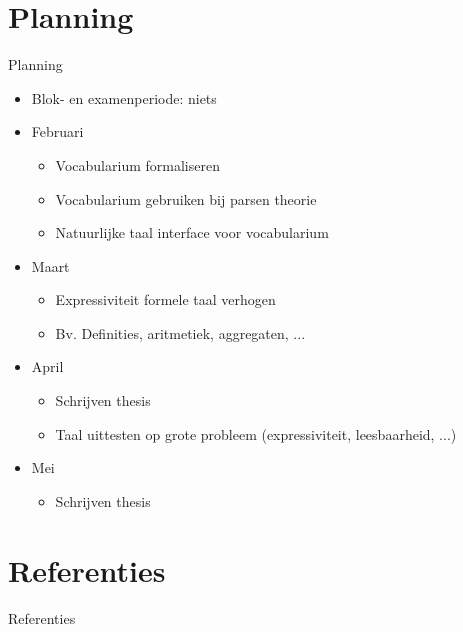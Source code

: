 \documentclass[notes, dvipsnames]{beamer}
\newcommand{\hitem}{
	\ppause
	\item
}
\newcommand{\ppause}{\onslide<+>}
\begin{document}
  \section{Planning}
  \begin{frame}{Planning}
			\begin{itemize}
        \hitem Blok- en examenperiode: niets
        \hitem Februari
          \begin{itemize}
            \item Vocabularium formaliseren
            \item Vocabularium gebruiken bij parsen theorie
            \item Natuurlijke taal interface voor vocabularium
          \end{itemize}
        \hitem Maart
          \begin{itemize}
            \item Expressiviteit formele taal verhogen
            \item Bv. Definities, aritmetiek, aggregaten, ...
          \end{itemize}
        \hitem April
          \begin{itemize}
            \item Schrijven thesis
            \item Taal uittesten op grote probleem (expressiviteit, leesbaarheid, ...)
          \end{itemize}
        \hitem Mei
          \begin{itemize}
            \item Schrijven thesis
          \end{itemize}
			\end{itemize}
  \end{frame}
			
	\section{Referenties}
	\begin{frame}[allowframebreaks]{Referenties}
		
		
	\end{frame}
	
\end{document}
